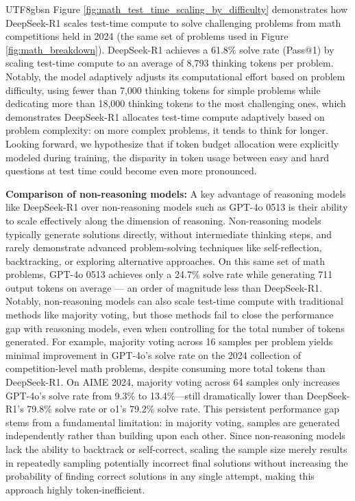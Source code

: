 \documentclass[11pt, a4paper, logo, copyright, nonumbering]{deepseek}
\newcommand{\dsri}{DeepSeek-R1}
\begin{document}
\begin{CJK*}{UTF8}{gbsn}
Figure \ref{fig:math_test_time_scaling_by_difficulty} demonstrates how \dsri{} scales test-time compute to solve challenging problems from math competitions held in 2024 (the same set of problems used in Figure \ref{fig:math_breakdown}).
\dsri{} achieves a 61.8\% solve rate (Pass@1) by scaling test-time compute to an average of 8,793 thinking tokens per problem.
Notably, the model adaptively adjusts its computational effort based on problem difficulty, using fewer than 7,000 thinking tokens for simple problems while dedicating more than 18,000 thinking tokens to the most challenging ones, which demonstrates DeepSeek-R1 allocates test-time compute adaptively based on problem complexity: on more complex problems, it tends to think for longer. Looking forward, we hypothesize that if token budget allocation were explicitly modeled during training, the disparity in token usage between easy and hard questions at test time could become even more pronounced.

\textbf{Comparison of non-reasoning models:} A key advantage of reasoning models like \dsri{} over non-reasoning models such as GPT-4o 0513 is their ability to scale effectively along the dimension of reasoning.
Non-reasoning models typically generate solutions directly, without intermediate thinking steps, and rarely demonstrate advanced problem-solving techniques like self-reflection, backtracking, or exploring alternative approaches.
On this same set of math problems, GPT-4o 0513 achieves only a 24.7\% solve rate while generating 711 output tokens on average — an order of magnitude less than \dsri{}.
Notably, non-reasoning models can also scale test-time compute with traditional methods like majority voting, but those methods fail to close the performance gap with reasoning models, even when controlling for the total number of tokens generated. For example, majority voting across 16 samples per problem yields minimal improvement in GPT-4o's solve rate on the 2024 collection of competition-level math problems, despite consuming more total tokens than \dsri{}. On AIME 2024, majority voting across 64 samples only increases GPT-4o's solve rate from 9.3\% to 13.4\%—still dramatically lower than \dsri{}'s 79.8\% solve rate or o1's 79.2\% solve rate. This persistent performance gap stems from a fundamental limitation: in majority voting, samples are generated independently rather than building upon each other. Since non-reasoning models lack the ability to backtrack or self-correct, scaling the sample size merely results in repeatedly sampling potentially incorrect final solutions without increasing the probability of finding correct solutions in any single attempt, making this approach highly token-inefficient.


\end{CJK*}
\end{document}
